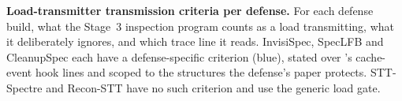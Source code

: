 \textbf{Load-transmitter transmission criteria per defense.} For each defense build, what the Stage~3 inspection program counts as a load transmitting, what it deliberately ignores, and which trace line it reads. InvisiSpec, SpecLFB and CleanupSpec each have a defense-specific criterion (blue), stated over \toolname{}'s cache-event hook lines and scoped to the structures the defense's paper protects. STT-Spectre and Recon-STT have no such criterion and use the generic load gate.